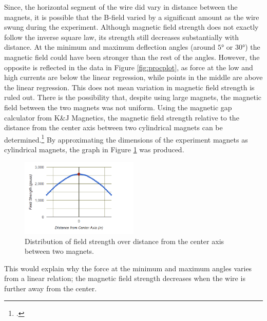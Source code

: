 Since, the horizontal segment of the wire did vary in distance between the magnets, it is possible that the B-field varied by a significant amount as the wire swung during the experiment.
Although magnetic field strength does not exactly follow the inverse square law, its strength still decreases substantially with distance.
At the minimum and maximum deflection angles (around $5\si{\degree}$ or $30\si{\degree}$) the magnetic field could have been stronger than the rest of the angles.
However, the opposite is reflected in the data in Figure \ref{fig:procplot}, as force at the low and high currents are below the linear regression, while points in the middle are above the linear regression.
This does not mean variation in magnetic field strength is ruled out.
There is the possibility that, despite using large magnets, the magnetic field between the two magnets was not uniform.
Using the magnetic gap calculator from K{\&}J Magnetics, the magnetic field strength relative to the distance from the center axis between two cylindrical magnets can be determined.\footcite{kjgap}
By approximating the dimensions of the experiment magnets as cylindrical magnets, the graph in Figure \ref{fig:gaps} was produced.
\begin{figure}[H]
	\centering
	\includegraphics[width=0.5\textwidth]{figures/gapplot.PNG}
	\caption{Distribution of field strength over distance from the center axis between two magnets.}
	\label{fig:gaps}
\end{figure}
This would explain why the force at the minimum and maximum angles varies from a linear relation; the magnetic field strength decreases when the wire is further away from the center.

